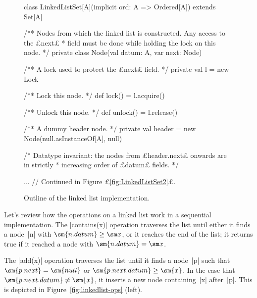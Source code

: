 \begin{figure}
\begin{scala}
class LinkedListSet[A](implicit ord: A => Ordered[A]) extends Set[A]{
  /** Nodes from which the linked list is constructed.  Any access to the £next£ 
    * field must be done while holding the lock on this node.  */
  private class Node(val datum: A, var next: Node){
    /** A lock used to protect the £next£ field. */
    private val l = new Lock

    /** Lock this node. */
    def lock() = l.acquire()

    /** Unlock this node. */
    def unlock() = l.release()
  }

  /** A dummy header node. */
  private val header = new Node(null.asInstanceOf[A], null)

  /* Datatype invariant: the nodes from £header.next£ onwards are in strictly
   * increasing order of £datum£ fields. */ 

  ... // Continued in Figure £\ref{fig:LinkedListSet2}£.
}
\end{scala}
\caption{Outline of the linked list implementation.}
\label{fig:LinkedListSet}
\end{figure}


Let's review how the operations on a linked list work in a sequential
implementation.  The |contains(x)| operation traverses the list until either
it finds a node~|n| with $\sm{n.datum} \ge \sm x$, or it reaches the end of
the list; it returns true if it reached a node with $\sm{n.datum} = \sm x$.

The |add(x)| operation traverses the list until it finds a node~|p| such that
$\sm{p.next} = \sm{null}$ or $\sm{p.next.datum} \ge \sm{x}$.  In the case that
$\sm{p.next.datum} \ne \sm{x}$, it inserts a new node containing~|x|
after~|p|.  This is depicted in Figure~\ref{fig:linkedlist-ops} (left).


